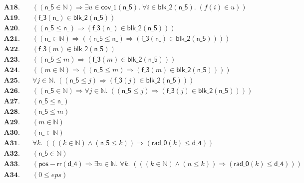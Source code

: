 \documentclass[11pt]{article}
\begin{document}
\begin{align*}
  \mathbf{A18.}\quad & ((\mathsf{n\_5} \in \mathbb{N}) \Rightarrow \exists u \in \mathsf{cov\_1}(\mathsf{n\_5}).\; \forall i \in \mathsf{blk\_2}(\mathsf{n\_5}).\; (f(i) \in u)) \\
  \mathbf{A19.}\quad & (\mathsf{f\_3}(\mathsf{n\_}) \in \mathsf{blk\_2}(\mathsf{n\_5})) \\
  \mathbf{A20.}\quad & ((\mathsf{n\_5} \leq \mathsf{n\_}) \Rightarrow (\mathsf{f\_3}(\mathsf{n\_}) \in \mathsf{blk\_2}(\mathsf{n\_5}))) \\
  \mathbf{A21.}\quad & ((\mathsf{n\_} \in \mathbb{N}) \Rightarrow ((\mathsf{n\_5} \leq \mathsf{n\_}) \Rightarrow (\mathsf{f\_3}(\mathsf{n\_}) \in \mathsf{blk\_2}(\mathsf{n\_5})))) \\
  \mathbf{A22.}\quad & (\mathsf{f\_3}(m) \in \mathsf{blk\_2}(\mathsf{n\_5})) \\
  \mathbf{A23.}\quad & ((\mathsf{n\_5} \leq m) \Rightarrow (\mathsf{f\_3}(m) \in \mathsf{blk\_2}(\mathsf{n\_5}))) \\
  \mathbf{A24.}\quad & ((m \in \mathbb{N}) \Rightarrow ((\mathsf{n\_5} \leq m) \Rightarrow (\mathsf{f\_3}(m) \in \mathsf{blk\_2}(\mathsf{n\_5})))) \\
  \mathbf{A25.}\quad & \forall j \in \mathbb{N}.\; ((\mathsf{n\_5} \leq j) \Rightarrow (\mathsf{f\_3}(j) \in \mathsf{blk\_2}(\mathsf{n\_5}))) \\
  \mathbf{A26.}\quad & ((\mathsf{n\_5} \in \mathbb{N}) \Rightarrow \forall j \in \mathbb{N}.\; ((\mathsf{n\_5} \leq j) \Rightarrow (\mathsf{f\_3}(j) \in \mathsf{blk\_2}(\mathsf{n\_5})))) \\
  \mathbf{A27.}\quad & (\mathsf{n\_5} \leq \mathsf{n\_}) \\
  \mathbf{A28.}\quad & (\mathsf{n\_5} \leq m) \\
  \mathbf{A29.}\quad & (m \in \mathbb{N}) \\
  \mathbf{A30.}\quad & (\mathsf{n\_} \in \mathbb{N}) \\
  \mathbf{A31.}\quad & \forall k.\; (((k \in \mathbb{N}) \wedge (\mathsf{n\_5} \leq k)) \Rightarrow (\mathsf{rad\_0}(k) \leq \mathsf{d\_4})) \\
  \mathbf{A32.}\quad & (\mathsf{n\_5} \in \mathbb{N}) \\
  \mathbf{A33.}\quad & (\mathsf{pos{-}rr}(\mathsf{d\_4}) \Rightarrow \exists n \in \mathbb{N}.\; \forall k.\; (((k \in \mathbb{N}) \wedge (n \leq k)) \Rightarrow (\mathsf{rad\_0}(k) \leq \mathsf{d\_4}))) \\
  \mathbf{A34.}\quad & (0 \leq \mathit{eps}) \\

\end{align*}
\end{document}
